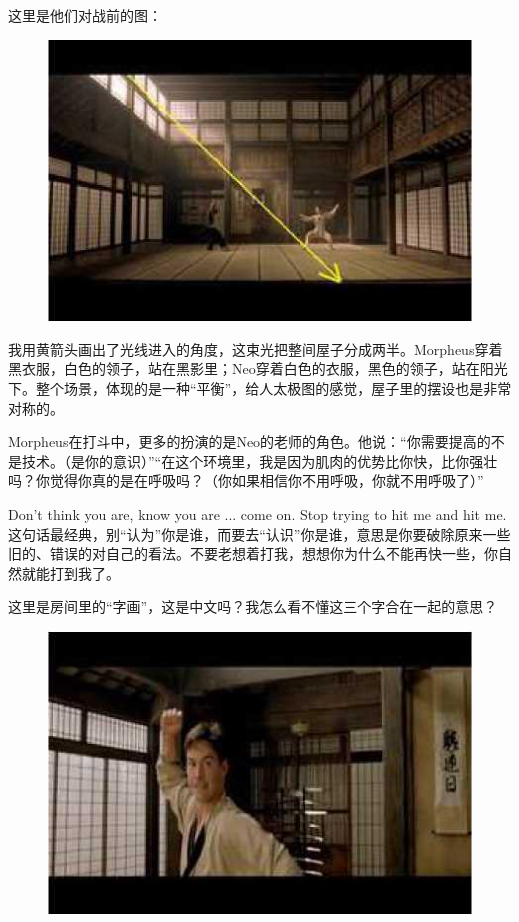 \documentclass[UTF8]{ctexart}
\begin{document}
这里是他们对战前的图：

\begin{figure}[htb]
\centering
\includegraphics[width=0.5\linewidth]{fig/read_Matrix-31}
\end{figure}

我用黄箭头画出了光线进入的角度，这束光把整间屋子分成两半。Morpheus穿着黑衣服，白色的领子，站在黑影里；Neo穿着白色的衣服，黑色的领子，站在阳光下。整个场景，体现的是一种“平衡”，给人太极图的感觉，屋子里的摆设也是非常对称的。

Morpheus在打斗中，更多的扮演的是Neo的老师的角色。他说：“你需要提高的不是技术。（是你的意识）”“在这个环境里，我是因为肌肉的优势比你快，比你强壮吗？你觉得你真的是在呼吸吗？（你如果相信你不用呼吸，你就不用呼吸了）”

Don't think you are, know you are ... come on. Stop trying to hit me and hit me. 这句话最经典，别“认为”你是谁，而要去“认识”你是谁，意思是你要破除原来一些旧的、错误的对自己的看法。不要老想着打我，想想你为什么不能再快一些，你自然就能打到我了。

这里是房间里的“字画”，这是中文吗？我怎么看不懂这三个字合在一起的意思？

\begin{figure}[htb]
\centering
\includegraphics[width=0.5\linewidth]{fig/read_Matrix-32}
\end{figure}
\end{document}
